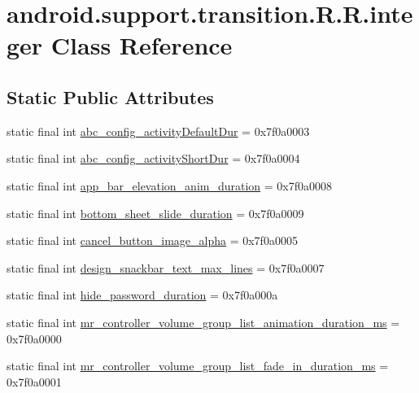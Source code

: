 \hypertarget{classandroid_1_1support_1_1transition_1_1_r_1_1integer}{
\section{android.support.transition.R.R.integer Class Reference}
\label{classandroid_1_1support_1_1transition_1_1_r_1_1integer}
}
\subsection*{Static Public Attributes}
\begin{CompactItemize}
\item 
static final int \hyperlink{classandroid_1_1support_1_1transition_1_1_r_1_1integer_292e480b26619d0a5b588728323e0215}{abc\_\-config\_\-activityDefaultDur} = 0x7f0a0003
\item 
static final int \hyperlink{classandroid_1_1support_1_1transition_1_1_r_1_1integer_d6c28fc3c3366ef5bcb1814fe31ee88d}{abc\_\-config\_\-activityShortDur} = 0x7f0a0004
\item 
static final int \hyperlink{classandroid_1_1support_1_1transition_1_1_r_1_1integer_4902e5877a76db558b075f6668008412}{app\_\-bar\_\-elevation\_\-anim\_\-duration} = 0x7f0a0008
\item 
static final int \hyperlink{classandroid_1_1support_1_1transition_1_1_r_1_1integer_479afb199b03defb7992d545005584ff}{bottom\_\-sheet\_\-slide\_\-duration} = 0x7f0a0009
\item 
static final int \hyperlink{classandroid_1_1support_1_1transition_1_1_r_1_1integer_a14b89ba8068a97346b19fa0a91ed64f}{cancel\_\-button\_\-image\_\-alpha} = 0x7f0a0005
\item 
static final int \hyperlink{classandroid_1_1support_1_1transition_1_1_r_1_1integer_2ab12951235504a5b39b3ad0704f3a22}{design\_\-snackbar\_\-text\_\-max\_\-lines} = 0x7f0a0007
\item 
static final int \hyperlink{classandroid_1_1support_1_1transition_1_1_r_1_1integer_4440c720fe41c95e4122d62667e4d794}{hide\_\-password\_\-duration} = 0x7f0a000a
\item 
static final int \hyperlink{classandroid_1_1support_1_1transition_1_1_r_1_1integer_648a2674f31ba8f04bd2b30bfc0b424e}{mr\_\-controller\_\-volume\_\-group\_\-list\_\-animation\_\-duration\_\-ms} = 0x7f0a0000
\item 
static final int \hyperlink{classandroid_1_1support_1_1transition_1_1_r_1_1integer_f1c97b3e224a4555287bf91a34a7cdfe}{mr\_\-controller\_\-volume\_\-group\_\-list\_\-fade\_\-in\_\-duration\_\-ms} = 0x7f0a0001

\end{CompactItemize}

